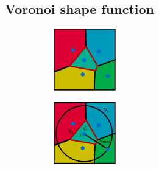 \subsection{Voronoi shape function}
\begin{figure}[!ht]
\centering
\begin{subfigure}[b]{0.20\linewidth}
\centering
\includegraphics[width=\linewidth]{images/cutting-mig2015/buildSF_1.pdf}
\caption{\label{fig:buildSF1}}
\end{subfigure}
\hspace{2cm}
\begin{subfigure}[b]{0.20\linewidth}
\centering
\includegraphics[width=\linewidth]{images/cutting-mig2015/buildSF_2.pdf}

\end{subfigure}
\end{figure}
